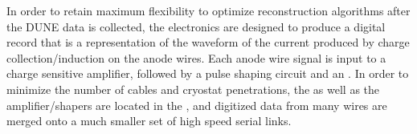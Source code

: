 In order to retain maximum flexibility to optimize reconstruction algorithms after the DUNE data is collected, the  electronics are designed to produce a digital record that is a representation of the waveform of the current produced by charge collection/induction on the anode wires.  Each anode wire signal is input to a charge sensitive amplifier, followed by a pulse shaping circuit and an .  In order to minimize the number of cables and cryostat penetrations, the  as well as the amplifier/shapers are located in the \lar, and digitized data from many wires are merged onto a much smaller set of high speed serial links.  %

